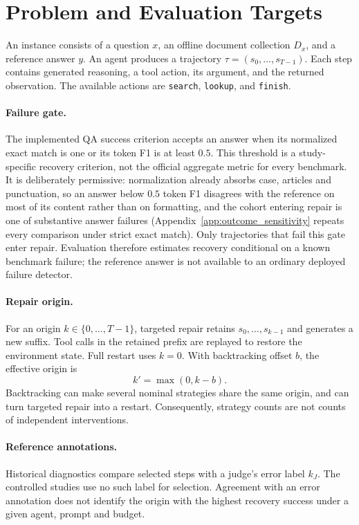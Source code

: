 \documentclass{article}
\begin{document}
\section{Problem and Evaluation Targets}
\label{sec:problem}
An instance consists of a question $x$, an offline document collection
$D_x$, and a reference answer $y$. An agent produces a trajectory
$\tau=(s_0,\ldots,s_{T-1})$. Each step contains generated reasoning, a
tool action, its argument, and the returned observation. The available
actions are \texttt{search}, \texttt{lookup}, and \texttt{finish}.

\paragraph{Failure gate.}
The implemented QA success criterion accepts an answer when its normalized
exact match is one or its token F1 is at least $0.5$. This threshold is a
study-specific recovery criterion, not the official aggregate metric for
every benchmark. It is deliberately permissive: normalization already absorbs
case, articles and punctuation, so an answer below $0.5$ token F1 disagrees
with the reference on most of its content rather than on formatting, and the
cohort entering repair is one of substantive answer failures
(Appendix~\ref{app:outcome_sensitivity} repeats every comparison under strict
exact match). Only trajectories that fail this gate enter repair.
Evaluation therefore estimates recovery conditional on a known benchmark
failure; the reference answer is not available to an ordinary deployed
failure detector.

\paragraph{Repair origin.}
For an origin $k\in\{0,\ldots,T-1\}$, targeted repair retains
$s_0,\ldots,s_{k-1}$ and generates a new suffix. Tool calls in the retained
prefix are replayed to restore the environment state. Full restart uses
$k=0$. With backtracking offset $b$, the effective origin is
\begin{equation}
  k' = \max(0,k-b).
\end{equation}
Backtracking can make several nominal strategies share the same origin,
and can turn targeted repair into a restart. Consequently, strategy counts
are not counts of independent interventions.

\paragraph{Reference annotations.}
Historical diagnostics compare selected steps with a judge's error label
$k_J$. The controlled studies use no such label for selection. Agreement
with an error annotation does not identify the origin with the highest
recovery success under a given agent, prompt and budget.
\end{document}
